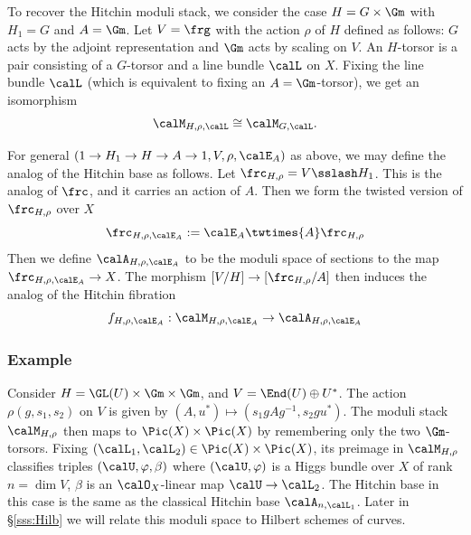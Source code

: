 To recover the Hitchin moduli stack, we consider the case $H=G\times\Gm$ with $H_{1}=G$ and $A=\Gm$. Let $V=\frg$ with the action $\rho$ of $H$ defined as follows: $G$ acts by the adjoint representation and $\Gm$ acts by scaling on $V$. An $H$-torsor is a pair consisting of a $G$-torsor and a line bundle $\calL$ on $X$. Fixing the line bundle $\calL$ (which is equivalent to fixing an $A=\Gm$-torsor), we get an isomorphism
\begin{equation*}
\calM_{H,\rho, \calL}\cong\calM_{G, \calL}.
\end{equation*}

For general $(1\to H_{1}\to H\to A\to 1,V,\rho,\calE_{A})$ as above, we may define the analog of the Hitchin base as follows. Let $\frc_{H,\rho}=V\sslash H_{1}$. This is the analog of $\frc$, and it carries an action of $A$. Then we form the twisted version of $\frc_{H,\rho}$ over $X$
\begin{equation*}
\frc_{H,\rho,\calE_{A}}:=\calE_{A}\twtimes{A}\frc_{H,\rho}
\end{equation*}
Then we define $\calA_{H,\rho,\calE_{A}}$ to be the moduli space of sections to the map $\frc_{H,\rho,\calE_{A}}\to X$. The morphism $[V/H]\to [\frc_{H,\rho}/A]$ then induces the analog of the Hitchin fibration
\begin{equation*}
f_{H,\rho,\calE_{A}}: \calM_{H,\rho,\calE_{A}}\to \calA_{H,\rho,\calE_{A}}
\end{equation*}


\subsubsection{Example}\label{sss:MHilb} Consider $H=\GL(U)\times\Gm\times\Gm$, and $V=\End(U)\oplus U^{*}$. The action $\rho(g,s_{1}, s_{2})$ on $V$ is given by $(A,u^{*})\mapsto (s_{1}gAg^{-1}, s_{2}gu^{*})$. The moduli stack $\calM_{H,\rho}$ then maps to $\Pic(X)\times\Pic(X)$ by remembering only the two $\Gm$-torsors. Fixing $(\calL_{1},\calL_{2})\in \Pic(X)\times\Pic(X)$, its  preimage  in $\calM_{H,\rho}$ classifies triples $(\calU,\varphi,\beta)$ where $(\calU,\varphi)$ is a Higgs bundle over $X$ of rank $n=\dim V$, $\beta$ is an $\calO_{X}$-linear map $\calU\to \calL_{2}$. The Hitchin base in this case is the same as the classical Hitchin base $\calA_{n,\calL_{1}}$. Later in \S\ref{sss:Hilb} we will relate this moduli space to Hilbert schemes of curves.



